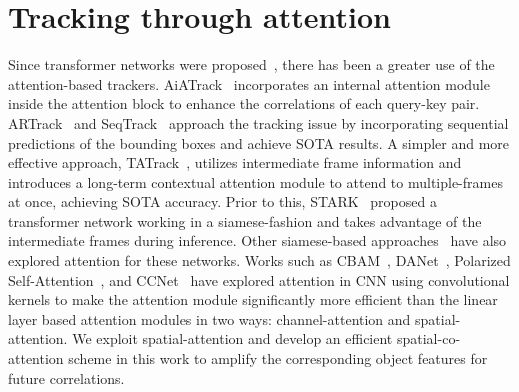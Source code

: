 \section{Tracking through attention}
Since transformer networks were proposed~\cite{vaswani2017attention, dosovitskiy2020image}, there has been a greater use of the attention-based trackers. AiATrack~\cite{gao2022aiatrack} incorporates an internal attention module inside the attention block to enhance the correlations of each query-key pair. ARTrack~\cite{wei2023autoregressive} and SeqTrack~\cite{chen2023seqtrack} approach the tracking issue by incorporating sequential predictions of the bounding boxes and achieve SOTA results. A simpler and more effective approach, TATrack~\cite{he2023target}, utilizes intermediate frame information and introduces a long-term contextual attention module to attend to multiple-frames at once, achieving SOTA accuracy. Prior to this, STARK~\cite{yan2021learning} proposed a transformer network working in a siamese-fashion and takes advantage of the intermediate frames during inference. Other siamese-based approaches~\cite{yu2020deformable, yang2020siamatt} have also explored attention for these networks. Works such as CBAM~\cite{woo2018cbam}, DANet~\cite{fu2019dual}, Polarized Self-Attention~\cite{liu2021polarized}, and CCNet~\cite{huang2019ccnet} have explored attention in CNN using convolutional kernels to make the attention module significantly more efficient than the linear layer based attention modules in two ways: channel-attention and spatial-attention. We exploit spatial-attention and develop an efficient spatial-co-attention scheme in this work to amplify the corresponding object features for future correlations.

